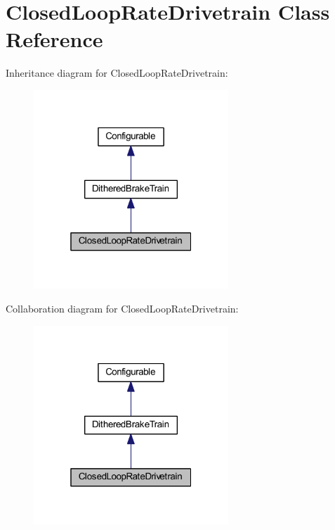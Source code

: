 \hypertarget{class_closed_loop_rate_drivetrain}{
\section{\-Closed\-Loop\-Rate\-Drivetrain \-Class \-Reference}
\label{class_closed_loop_rate_drivetrain}
}


\-Inheritance diagram for \-Closed\-Loop\-Rate\-Drivetrain\-:\nopagebreak
\begin{figure}[H]
\begin{center}
\leavevmode
\includegraphics[width=208pt]{class_closed_loop_rate_drivetrain__inherit__graph}
\end{center}
\end{figure}


\-Collaboration diagram for \-Closed\-Loop\-Rate\-Drivetrain\-:\nopagebreak
\begin{figure}[H]
\begin{center}
\leavevmode
\includegraphics[width=208pt]{class_closed_loop_rate_drivetrain__coll__graph}
\end{center}
\end{figure}
